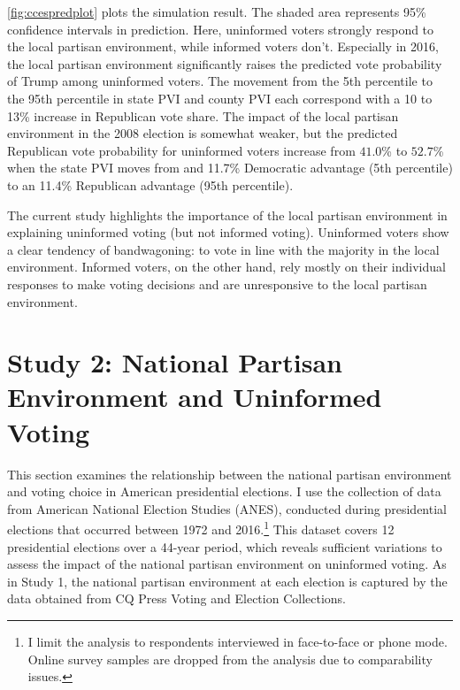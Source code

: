 \documentclass[letterpaper, 12pt]{article}
\begin{document}
    \par \autoref{fig:ccespredplot} plots the simulation result. The shaded area represents 95\% confidence intervals in prediction. Here, uninformed voters strongly respond to the local partisan environment, while informed voters don't.  Especially in 2016, the local partisan environment significantly raises the predicted vote probability of Trump among uninformed voters. The movement from the 5th percentile to the 95th percentile in state PVI and county PVI each correspond with a 10 to 13\% increase in Republican vote share. The impact of the local partisan environment in the 2008 election is somewhat weaker, but the predicted Republican vote probability for uninformed voters increase from $41.0$\% to $52.7$\% when the state PVI moves from and 11.7\% Democratic advantage (5th percentile) to an 11.4\% Republican advantage (95th percentile).
    
    \par The current study highlights the importance of the local partisan environment in explaining uninformed voting (but not informed voting). Uninformed voters show a clear tendency of bandwagoning: to vote in line with the majority in the local environment. Informed voters, on the other hand, rely mostly on their individual responses to make voting decisions and are unresponsive to the local partisan environment.

    \section*{Study 2: National Partisan Environment and Uninformed Voting}

    \par This section examines the relationship between the national partisan environment and voting choice in American presidential elections. I use the collection of data from American National Election Studies (ANES), conducted during presidential elections that occurred between 1972 and 2016.\footnote{I limit the analysis to respondents interviewed in face-to-face or phone mode. Online survey samples are dropped from the analysis due to comparability issues.} This dataset covers 12 presidential elections over a 44-year period, which reveals sufficient variations to assess the impact of the national partisan environment on uninformed voting. As in Study 1, the national partisan environment at each election is captured by the data obtained from CQ Press Voting and Election Collections. 
\end{document}
